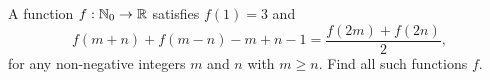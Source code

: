 A function $f : \Bbb{N}_0 \to \Bbb{R}$ satisﬁes $f(1) = 3$ and \[f(m + n) + f(m - n) - m + n - 1 =\frac{f(2m) + f(2n)}{2},\]for any non-negative integers $m$ and $n$ with $m \geq n.$ Find all such functions $f$.